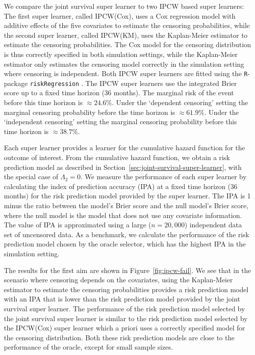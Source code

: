 \documentclass[alpha-refs]{wiley-article}
\newcommand{\1}{\mathds{1}}
\begin{document}
We compare the joint survival super learner to two IPCW based super
learners: The first super learner, called IPCW(Cox), uses a Cox
regression model with additive effects of the five covariates to
estimate the censoring probabilities, while the second super learner,
called IPCW(KM), uses the Kaplan-Meier estimator to estimate the
censoring probabilities. The Cox model for the censoring distribution
is thus correctly specified in both simulation settings, while the
Kaplan-Meier estimator only estimates the censoring model correctly in
the simulation setting where censoring is independent. Both IPCW super
learners are fitted using the \texttt{R}-package
\texttt{riskRegression} \citep{Gerds_Ohlendorff_Ozenne_2023}.
%
%
The IPCW super learners use the integrated Brier score up to a fixed time
horizon (36 months). The marginal risk of the event before this time horizon is
\(\approx 24.6\)\%. Under the `dependent censoring' setting the marginal
censoring probability before the time horizon is \(\approx 61.9\)\%. Under the
`independent censoring' setting the marginal censoring probability before this
time horizon is \( \approx 38.7 \)\%.

Each super learner provides a learner for the cumulative hazard
function for the outcome of interest. From the cumulative hazard
function, we obtain a risk prediction model as described in
Section~\ref{sec:joint-survival-super-learner}, with the special case
of $\Lambda_2 = 0$. We measure the performance of each super learner
by calculating the index of prediction accuracy (IPA)
\citep{kattan2018index} at a fixed time horizon (36 months) for the
risk prediction model provided by the super learner. The IPA is 1
minus the ratio between the model's Brier score and the null model's
Brier score, where the null model is the model that does not use any
covariate information. The value of IPA is approximated using a large
(\( n = 20,000 \)) independent data set of uncensored data. As a
benchmark, we calculate the performance of the risk prediction model
chosen by the oracle selector, which has the highest IPA in the
simulation setting.

The results for the first aim are shown in
Figure~\ref{fig:ipcw-fail}. We see that in the scenario where
censoring depends on the covariates, using the Kaplan-Meier estimator
to estimate the censoring probabilities provides a risk prediction
model with an IPA that is lower than the risk prediction model
provided by the joint survival super learner. The performance of the
risk prediction model selected by the joint survival super learner is
similar to the risk prediction model selected by the IPCW(Cox) super
learner which a priori uses a correctly specified model for the
censoring distribution. Both these risk prediction models are close to
the performance of the oracle, except for small sample sizes.
\end{document}
